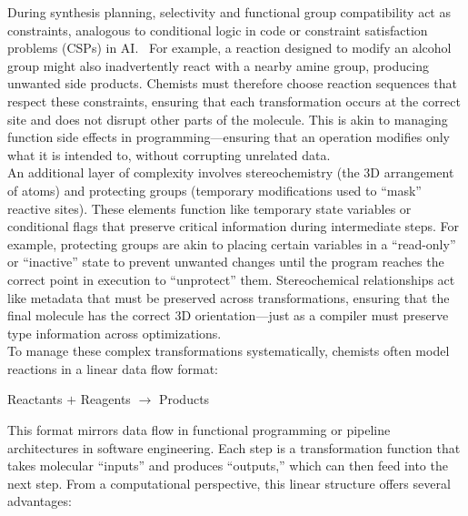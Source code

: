 \documentclass[12pt]{article}
\begin{document}
During synthesis planning, selectivity and functional group compatibility act as constraints, analogous to conditional logic in code or constraint satisfaction problems (CSPs) in AI.~\cite{10.1109/ICTAI.2004.38}
For example, a reaction designed to modify an alcohol group might also inadvertently react with a nearby amine group, producing unwanted side products.
Chemists must therefore choose reaction sequences that respect these constraints, ensuring that each transformation occurs at the correct site and does not disrupt other parts of the molecule.
This is akin to managing function side effects in programming—ensuring that an operation modifies only what it is intended to, without corrupting unrelated data.
\\
\indent
An additional layer of complexity involves stereochemistry (the 3D arrangement of atoms) and protecting groups (temporary modifications used to “mask” reactive sites).
These elements function like temporary state variables or conditional flags that preserve critical information during intermediate steps.
For example, protecting groups are akin to placing certain variables in a “read-only” or “inactive” state to prevent unwanted changes until the program reaches the correct point in execution to “unprotect” them.
Stereochemical relationships act like metadata that must be preserved across transformations, ensuring that the final molecule has the correct 3D orientation—just as a compiler must preserve type information across optimizations.
\\
\indent
To manage these complex transformations systematically, chemists often model reactions in a linear data flow format:
\\
\begin{center}
{Reactants $+$ Reagents $\rightarrow$ Products}
\end{center}
\indent
This format mirrors data flow in functional programming or pipeline architectures in software engineering.
Each step is a transformation function that takes molecular “inputs” and produces “outputs,” which can then feed into the next step.
From a computational perspective, this linear structure offers several advantages:
\end{document}
